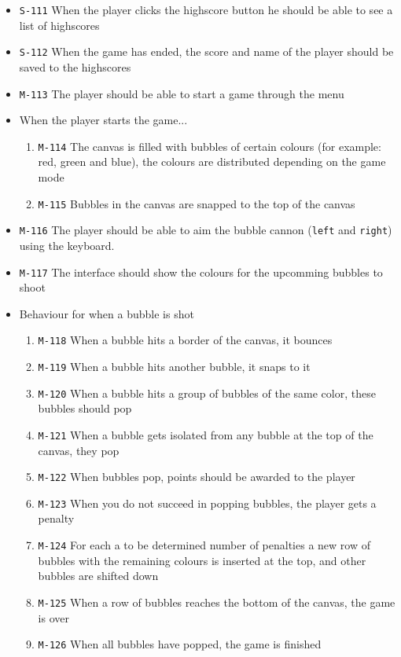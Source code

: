 \documentclass[a4paper]{article}
\begin{document}
\begin{itemize}
  \item \texttt{S-111} When the player clicks the highscore button he should be able to see a list of highscores
  \item \texttt{S-112} When the game has ended, the score and name of the player should be saved to the highscores
  \item \texttt{M-113} The player should be able to start a game through the menu

  \item When the player starts the game...
  \begin{enumerate}
    \item \texttt{M-114} The canvas is filled with bubbles of certain colours (for example: red, green and blue), the colours are distributed depending on the game mode
    \item \texttt{M-115} Bubbles in the canvas are snapped to the top of the canvas
  \end{enumerate}
  
  \item \texttt{M-116} The player should be able to aim the bubble cannon (\texttt{left} and \texttt{right}) using the keyboard.
  \item \texttt{M-117} The interface should show the colours for the upcomming bubbles to shoot
  \item Behaviour for when a bubble is shot
  \begin{enumerate}
    \item \texttt{M-118} When a bubble hits a border of the canvas, it bounces
    \item \texttt{M-119} When a bubble hits another bubble, it snaps to it
    \item \texttt{M-120} When a bubble hits a group of bubbles of the same color, these bubbles should pop
    \item \texttt{M-121} When a bubble gets isolated from any bubble at the top of the canvas, they pop
    \item \texttt{M-122} When bubbles pop, points should be awarded to the player
    \item \texttt{M-123} When you do not succeed in popping bubbles, the player gets a penalty
    \item \texttt{M-124} For each a to be determined number of penalties a new row of bubbles with the remaining colours is inserted at the top, and other bubbles are shifted down
    \item \texttt{M-125} When a row of bubbles reaches the bottom of the canvas, the game is over
    \item \texttt{M-126} When all bubbles have popped, the game is finished
  \end{enumerate}
  

\end{itemize}
\end{document}
